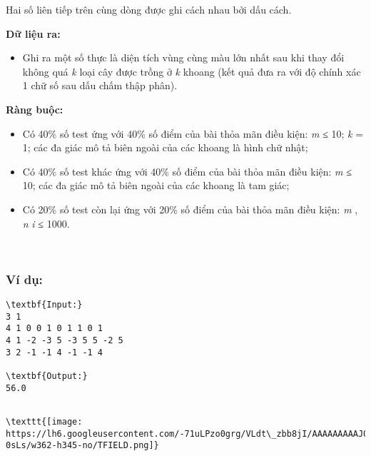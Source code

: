 Hai số liên tiếp trên cùng dòng được ghi cách nhau bởi dấu cách.

\textbf{Dữ liệu ra: }
\begin{itemize}
	\item Ghi ra một số thực là diện tích vùng cùng màu lớn nhất sau khi thay đổi không quá \emph{ k } loại cây được trồng ở \emph{ k } khoang (kết quả đưa ra với độ chính xác 1 chữ số sau dấu chấm thập phân).
\end{itemize}

\textbf{Ràng buộc: }
\begin{itemize}
	\item Có 40\% số test ứng với 40\% số điểm của bài thỏa mãn điều kiện: \emph{ m } ≤ 10; \emph{ k } = 1; các đa giác mô tả biên ngoài của các khoang là hình chữ nhật;
	\item Có 40\% số test khác ứng với 40\% số điểm của bài thỏa mãn điều kiện: \emph{ m } ≤ 10; các đa giác mô tả biên ngoài của các khoang là tam giác;
	\item Có 20\% số test còn lại ứng với 20\% số điểm của bài thỏa mãn điều kiện: \emph{ m } , \emph{ n }\emph{ i } ≤ 1000.
\end{itemize}

 

\subsubsection{Ví dụ:}
\begin{verbatim}
\textbf{Input:}
3 1
4 1 0 0 1 0 1 1 0 1
4 1 -2 -3 5 -3 5 5 -2 5
3 2 -1 -1 4 -1 -1 4

\textbf{Output:}
56.0\end{verbatim}
\begin{verbatim}

\texttt{[image: https://lh6.googleusercontent.com/-71uLPzo0grg/VLdt\_zbb8jI/AAAAAAAAAJ0/oLS4N1-0sLs/w362-h345-no/TFIELD.png]}\end{verbatim}